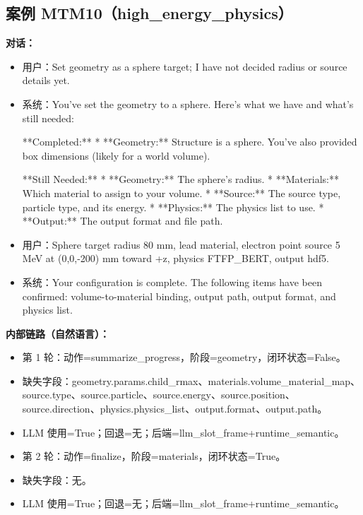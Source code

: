 \documentclass[11pt]{ctexart}
\begin{document}
\subsection{案例 MTM10（high\_energy\_physics）}
\textbf{对话：}
\begin{itemize}
\item 用户：Set geometry as a sphere target; I have not decided radius or source details yet.
\item 系统：You've set the geometry to a sphere. Here's what we have and what's still needed:

**Completed:**
*   **Geometry:** Structure is a sphere. You've also provided box dimensions (likely for a world volume).

**Still Needed:**
*   **Geometry:** The sphere's radius.
*   **Materials:** Which material to assign to your volume.
*   **Source:** The source type, particle type, and its energy.
*   **Physics:** The physics list to use.
*   **Output:** The output format and file path.
\item 用户：Sphere target radius 80 mm, lead material, electron point source 5 MeV at (0,0,-200) mm toward +z, physics FTFP\_BERT, output hdf5.
\item 系统：Your configuration is complete. The following items have been confirmed: volume-to-material binding, output path, output format, and physics list.
\end{itemize}
\textbf{内部链路（自然语言）：}
\begin{itemize}
\item 第 1 轮：动作=summarize\_progress，阶段=geometry，闭环状态=False。
\item 缺失字段：geometry.params.child\_rmax、materials.volume\_material\_map、source.type、source.particle、source.energy、source.position、source.direction、physics.physics\_list、output.format、output.path。
\item LLM 使用=True；回退=无；后端=llm\_slot\_frame+runtime\_semantic。
\item 第 2 轮：动作=finalize，阶段=materials，闭环状态=True。
\item 缺失字段：无。
\item LLM 使用=True；回退=无；后端=llm\_slot\_frame+runtime\_semantic。
\end{itemize}
\end{document}
